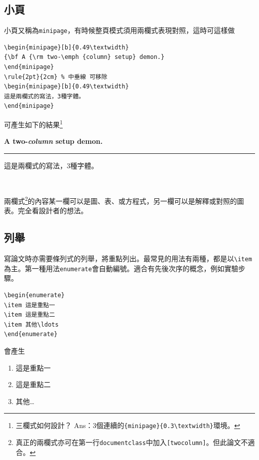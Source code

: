 \subsection{小頁}
小頁又稱為{\tt minipage}，有時候整頁模式須用兩欄式表現對照，這時可這樣做\\
\begin{Verbatim}[frame=single, firstline=1,label=Minipage]
\begin{minipage}[b]{0.49\textwidth}
{\bf A {\rm two-\emph {column} setup} demon.}
\end{minipage}
\rule{2pt}{2cm} % 中垂線 可移除
\begin{minipage}[b]{0.49\textwidth}
這是兩欄式的寫法，3種字體。
\end{minipage}
\end{Verbatim}
可產生如下的結果\footnote{三欄式如何設計？ Ans：3個連續的{\tt \{minipage\}\{0.3\textbackslash textwidth\}}環境。}\\
\begin{minipage}[b]{0.49\textwidth} 
{\bf A {\rm two-\emph {column} setup} demon.}  
\end{minipage}
\rule{2pt}{2cm}%
\begin{minipage}[b]{0.49\textwidth}
這是兩欄式的寫法，3種字體。
\end{minipage}\\ 

兩欄式\footnote{真正的兩欄式亦可在第一行{\tt documentclass}中加入{\tt [twocolumn]}。但此論文不適合。}的內容某一欄可以是圖、表、或方程式，另一欄可以是解釋或對照的圖表。完全看設計者的想法。

\subsection{列舉} 
寫論文時亦需要條列式的列舉，將重點列出。最常見的用法有兩種，都是以\verb+\item+為主。第一種用法{\tt enumerate}會自動編號。適合有先後次序的概念，例如實驗步驟。\\
\begin{Verbatim}[frame=single,firstline=1,label=Enumerate]
\begin{enumerate}
\item 這是重點一
\item 這是重點二
\item 其他\ldots
\end{enumerate}
\end{Verbatim}
會產生
\begin{enumerate}
\item 這是重點一
\item 這是重點二
\item 其他\ldots
\end{enumerate}

